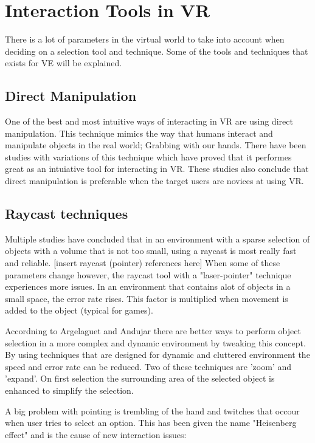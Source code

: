 \section{Interaction Tools in VR}
\label{theory:toolsandtech}
There is a lot of parameters in the virtual world to take into account when deciding on a selection tool and technique. Some of the tools and techniques that exists for VE will be explained.
\subsection{Direct Manipulation}
One of the best and most intuitive ways of interacting in VR are using direct  manipulation.\cite{tools:jacoby1994gestural} This technique mimics the way that humans interact and manipulate objects in the real world; Grabbing with our hands. There have been studies with variations of this technique which have proved that it performes great as an intuiative tool for interacting in VR.\cite{tools:Buchmann2004,tools:Cutler1997} These studies also conclude that direct manipulation is preferable when the target users are novices at using VR.
\subsection{Raycast techniques}
\label{theory:toolsandtech:raycast}
Multiple studies have concluded that in an environment with a sparse selection of objects with a volume that is not too small, using a raycast is most really fast and reliable. [insert raycast (pointer) references here] When some of these parameters change however, the raycast tool with a "laser-pointer" technique experiences more issues. In an environment that contains alot of objects in a small space, the error rate rises. This factor is multiplied when movement is added to the object (typical for games).

Accordning to Argelaguet and Andujar there are better ways to perform object selection in a more complex and dynamic environment by tweaking this concept.\cite{selection:Argelaguet2008} By using techniques that are designed for dynamic and cluttered environment the speed and error rate can be reduced. Two of these techniques are 'zoom' and 'expand'. On first selection the surrounding area of the selected object is enhanced to simplify the selection.

A big problem with pointing is trembling of the hand and twitches that occour when user tries to select an option. This has been given the name "Heisenberg effect" and is the cause of new interaction issues\cite{selection:Bowman2001}:

